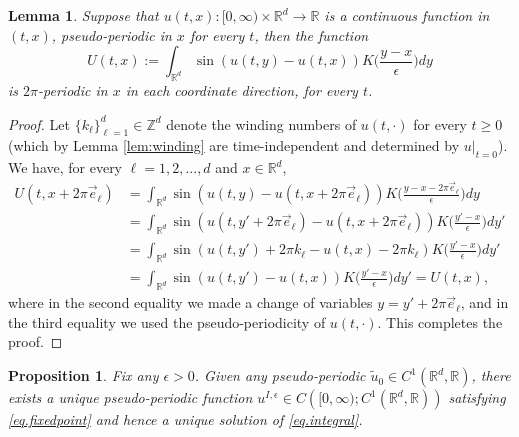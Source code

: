 \documentclass[a4paper,11pt]{amsart}
\newtheorem{lemma}[theorem]{Lemma}
\newtheorem{proposition}[theorem]{Proposition}
\newcommand{\red}[1]{{#1}}
\newcommand{\R}{\mathbb{R}}
\newcommand{\Z}{\mathbb{Z}}
\newcommand{\ep}{\epsilon}
\numberwithin{equation}{section}
\numberwithin{theorem}{section}
\theoremstyle{definition}
\begin{document}
\red{
\begin{lemma}\label{lem:periodic}
Suppose that $u(t,x):[0,\infty)\times\R^d\to\R$ is a continuous function in $(t,x)$, pseudo-periodic in $x$ for every $t$, then the function
\[
U(t,x):=\int_{\R^d}\sin\left(u(t,y) - u(t,x)\right)K\Big(\frac{y-x}{\ep}\Big)dy
\]
is $2\pi$-periodic in $x$ in each coordinate direction, for every $t$.
\end{lemma}
\begin{proof}
    Let $\{k_\ell\}_{\ell=1}^d \in\Z^d$ denote the winding numbers of $u(t,\cdot)$ for every $t\ge0$ (which by Lemma \ref{lem:winding} are time-independent and determined by $u|_{t=0}$). We have, for every $\ell=1,2,...,d$ and $x\in\R^d$,
    \begin{align*}
       U(t,x+2\pi \vec e_\ell) &=\int_{\R^d}\sin\left(u(t,y) - u(t,x+2\pi \vec e_\ell)\right)K\Big(\frac{y-x-2\pi \vec e_\ell}{\ep}\Big)dy\\
        &=\int_{\R^d}\sin\left(u(t,y'+2\pi \vec e_\ell) - u(t,x+2\pi \vec e_\ell)\right)K\Big(\frac{y'-x}{\ep}\Big)dy'\\
        &=\int_{\R^d}\sin\left(u(t,y')+2\pi k_\ell - u(t,x)-2\pi k_\ell\right)K\Big(\frac{y'-x}{\ep}\Big)dy'\\
        &=\int_{\R^d}\sin\left(u(t,y') - u(t,x)\right)K\Big(\frac{y'-x}{\ep}\Big)dy'=U(t,x),
    \end{align*}
    where in the second equality we made a change of variables $y=y'+2\pi \vec e_\ell$, and in the third equality we used the pseudo-periodicity of $u(t,\cdot)$. This completes the proof.
\end{proof}
}

\begin{proposition}\label{prop.existence}
Fix any $\ep>0$. Given \red{any pseudo-periodic $\tilde u_0\in C^1(\R^d,\R)$}, there exists a unique \red{pseudo-periodic function $u^{I,\ep}\in C\left([0,\infty);C^1(\R^d,\R)\right)$} satisfying \eqref{eq.fixedpoint} and hence a unique solution of \eqref{eq.integral}.
\end{proposition}
\end{document}
